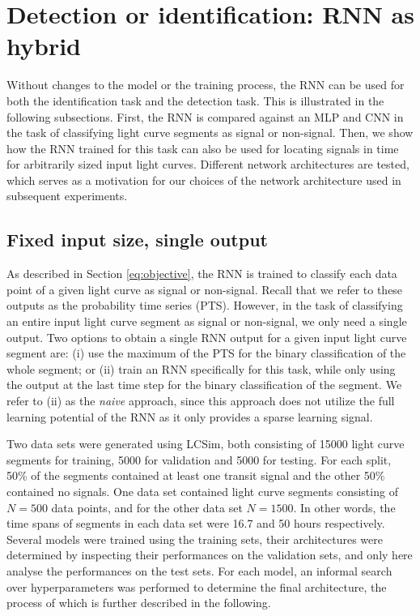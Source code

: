 
\section{Detection or identification: RNN as hybrid}

Without changes to the model or the training process, the RNN can be used for both the identification task and the detection task. This is illustrated in the following subsections. First, the RNN is compared against an MLP and CNN in the task of classifying light curve segments as signal or non-signal. Then, we show how the RNN trained for this task can also be used for locating signals in time for arbitrarily sized input light curves. Different network architectures are tested, which serves as a motivation for our choices of the network architecture used in subsequent experiments.

\subsection{Fixed input size, single output}
\label{sec:identification}

As described in Section \ref{eq:objective}, the RNN is trained to classify each data point of a given light curve as signal or non-signal. Recall that we refer to these outputs as the probability time series (PTS). However, in the task of classifying an entire input light curve segment as signal or non-signal, we only need a single output. Two options to obtain a single RNN output for a given input light curve segment are: (i) use the maximum of the PTS for the binary classification of the whole segment; or (ii) train an RNN specifically for this task, while only using the output at the last time step for the binary classification of the segment. We refer to (ii) as the \textit{naive} approach, since this approach does not utilize the full learning potential of the RNN as it only provides a sparse learning signal. 

Two data sets were generated using LCSim, both consisting of 15000 light curve segments for training, 5000 for validation and 5000 for testing. For each split, 50\% of the segments contained at least one transit signal and the other 50\% contained no signals. One data set contained light curve segments consisting of $N=500$ data points, and for the other data set $N = 1500$. In other words, the time spans of segments in each data set were 16.7 and 50 hours respectively. Several models were trained using the training sets, their architectures were determined by inspecting their performances on the validation sets, and only here analyse the performances on the test sets. For each model, an informal search over hyperparameters was performed to determine the final architecture, the process of which is further described in the following.

